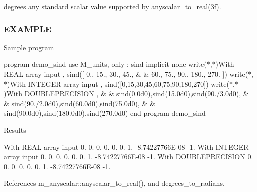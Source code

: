 degrees any standard scalar value supported by anyscalar\+\_\+to\+\_\+real(3f). \subsubsection*{E\+X\+A\+M\+P\+LE}

Sample program

program demo\+\_\+sind use M\+\_\+units, only \+: sind implicit none write($\ast$,$\ast$)\textquotesingle{}With R\+E\+AL array input \textquotesingle{}, sind(\mbox{[} 0., 15., 30., 45., \& \& 60., 75., 90., 180., 270. \mbox{]}) write($\ast$,$\ast$)\textquotesingle{}With I\+N\+T\+E\+G\+ER array input \textquotesingle{}, sind(\mbox{[}0,15,30,45,60,75,90,180,270\mbox{]}) write($\ast$,$\ast$)\textquotesingle{}With D\+O\+U\+B\+L\+E\+P\+R\+E\+C\+I\+S\+I\+ON \textquotesingle{}, \& \& sind(0.\+0d0),sind(15.\+0d0),sind(90./3.0d0), \& \& sind(90./2.0d0),sind(60.\+0d0),sind(75.\+0d0), \& \& sind(90.\+0d0),sind(180.\+0d0),sind(270.\+0d0) end program demo\+\_\+sind

Results

With R\+E\+AL array input 0. 0. 0. 0. 0. 0. 1. -\/8.\+74227766E-\/08 -\/1. With I\+N\+T\+E\+G\+ER array input 0. 0. 0. 0. 0. 0. 1. -\/8.\+74227766E-\/08 -\/1. With D\+O\+U\+B\+L\+E\+P\+R\+E\+C\+I\+S\+I\+ON 0. 0. 0. 0. 0. 0. 1. -\/8.\+74227766E-\/08 -\/1. 

References m\+\_\+anyscalar\+::anyscalar\+\_\+to\+\_\+real(), and degrees\+\_\+to\+\_\+radians.

\mbox{\label{namespacem__units_ae79705192f0982ec3a091c4df260dfcd}} 
